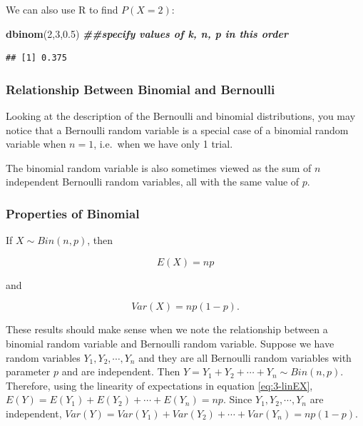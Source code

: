\documentclass[
]{book}
\newenvironment{Shaded}{\begin{snugshade}}{\end{snugshade}}
\newcommand{\DecValTok}[1]{\textcolor[rgb]{0.00,0.00,0.81}{#1}}
\newcommand{\DocumentationTok}[1]{\textcolor[rgb]{0.56,0.35,0.01}{\textbf{\textit{#1}}}}
\newcommand{\FloatTok}[1]{\textcolor[rgb]{0.00,0.00,0.81}{#1}}
\newcommand{\FunctionTok}[1]{\textcolor[rgb]{0.13,0.29,0.53}{\textbf{#1}}}
\newcommand{\NormalTok}[1]{#1}
\begin{document}
We can also use R to find \(P(X=2)\):

\begin{Shaded}
\begin{Highlighting}[]
\FunctionTok{dbinom}\NormalTok{(}\DecValTok{2}\NormalTok{,}\DecValTok{3}\NormalTok{,}\FloatTok{0.5}\NormalTok{) }\DocumentationTok{\#\#specify values of k, n, p in this order}
\end{Highlighting}
\end{Shaded}

\begin{verbatim}
## [1] 0.375
\end{verbatim}

\hypertarget{relationship-between-binomial-and-bernoulli}{%
\subsubsection{Relationship Between Binomial and Bernoulli}\label{relationship-between-binomial-and-bernoulli}}

Looking at the description of the Bernoulli and binomial distributions, you may notice that a Bernoulli random variable is a special case of a binomial random variable when \(n=1\), i.e.~when we have only 1 trial.

The binomial random variable is also sometimes viewed as the sum of \(n\) independent Bernoulli random variables, all with the same value of \(p\).

\hypertarget{properties-of-binomial}{%
\subsubsection{Properties of Binomial}\label{properties-of-binomial}}

If \(X \sim Bin(n,p)\), then

\begin{equation} 
E(X) = np
\label{eq:3-bin-EX}
\end{equation}

and

\begin{equation} 
Var(X) = np(1-p).
\label{eq:3-bin-var}
\end{equation}

These results should make sense when we note the relationship between a binomial random variable and Bernoulli random variable. Suppose we have random variables \(Y_1, Y_2, \cdots, Y_n\) and they are all Bernoulli random variables with parameter \(p\) and are independent. Then \(Y = Y_1 + Y_2 + \cdots + Y_n \sim Bin(n,p)\). Therefore, using the linearity of expectations in equation \eqref{eq:3-linEX}, \(E(Y) = E(Y_1) + E(Y_2) + \cdots + E(Y_n) = np\). Since \(Y_1, Y_2, \cdots, Y_n\) are independent, \(Var(Y) = Var(Y_1) + Var(Y_2) + \cdots + Var(Y_n) = np(1-p)\).
\end{document}
